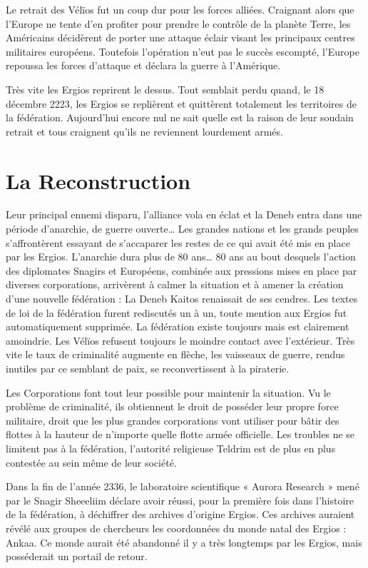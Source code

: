 \begin{multicols}{2}
Le retrait des Vélïos fut un coup dur pour les forces alliées. Craignant alors que l’Europe ne tente d’en profiter pour prendre le contrôle de la planète Terre, les Américains décidèrent de porter une attaque éclair visant les principaux centres militaires européens. Toutefois l’opération n’eut pas le succès escompté, l’Europe repoussa les forces d’attaque et déclara la guerre à l’Amérique.

Très vite les Ergios reprirent le dessus. Tout semblait perdu quand, le 18 décembre 2223, les Ergios se replièrent et quittèrent totalement les territoires de la fédération. Aujourd’hui encore nul ne sait quelle est la raison de leur soudain retrait et tous craignent qu’ils ne reviennent lourdement armés.

\section{La Reconstruction}

Leur principal ennemi disparu, l’alliance vola en éclat et la Deneb entra dans une période d’anarchie, de guerre ouverte… Les grandes nations et les grands peuples s’affrontèrent essayant de s’accaparer les restes de ce qui avait été mis en place par les Ergios. L’anarchie dura plus de 80 ans… 80 ans au bout desquels l’action des diplomates Snagirs et Européens, combinée aux pressions mises en place par diverses corporations, arrivèrent à calmer la situation et à amener la création d’une nouvelle fédération : La Deneb Kaitos renaissait de ses cendres. 
Les textes de loi de la fédération furent rediscutés un à un, toute mention aux Ergios fut automatiquement supprimée. La fédération existe toujours mais est clairement amoindrie. Les Vélïos refusent toujours le moindre contact avec l’extérieur. Très vite le taux de criminalité augmente en flèche, les vaisseaux de guerre, rendus inutiles par ce semblant de paix, se reconvertissent à la piraterie.

Les Corporations font tout leur possible pour maintenir la situation. Vu le problème de criminalité, ils obtiennent le droit de posséder leur propre force militaire, droit que les plus grandes corporations vont utiliser pour bâtir des flottes à la hauteur de n’importe quelle flotte armée officielle. Les troubles ne se limitent pas à la fédération, l’autorité religieuse Teldrim est de plus en plus contestée au sein même de leur société. 

Dans la fin de l’année 2336, le laboratoire scientifique « Aurora Research » mené par le Snagir Sheeeliim déclare avoir réussi, pour la première fois dans l’histoire de la fédération, à déchiffrer des archives d’origine Ergios. Ces archives auraient révélé aux groupes de chercheurs les coordonnées du monde natal des Ergios : Ankaa. Ce monde aurait été abandonné il y a très longtemps par les Ergios, mais posséderait un portail de retour. 


\end{multicols}

